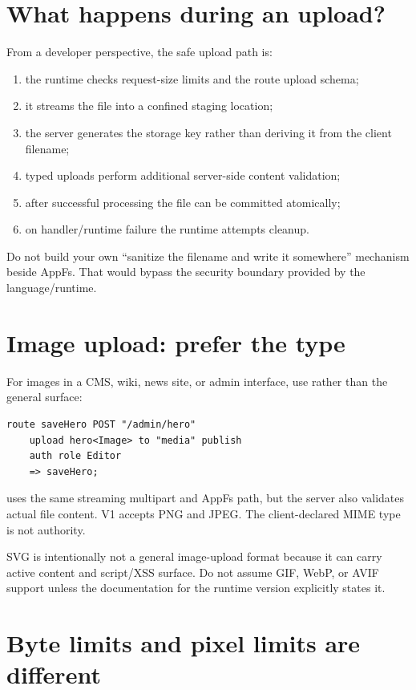\section{What happens during an upload?}

From a developer perspective, the safe upload path is:

\begin{enumerate}
  \item the runtime checks request-size limits and the route upload schema;
  \item it streams the file into a confined staging location;
  \item the server generates the storage key rather than deriving it from the client filename;
  \item typed uploads perform additional server-side content validation;
  \item after successful processing the file can be committed atomically;
  \item on handler/runtime failure the runtime attempts cleanup.
\end{enumerate}

Do not build your own ``sanitize the filename and write it somewhere'' mechanism beside AppFs. That would bypass the security boundary provided by the language/runtime.

\section{Image upload: prefer the  type}

For images in a CMS, wiki, news site, or admin interface, use  rather than the general  surface:

\begin{lstlisting}[language=RWLang]
route saveHero POST "/admin/hero"
    upload hero<Image> to "media" publish
    auth role Editor
    => saveHero;
\end{lstlisting}

 uses the same streaming multipart and AppFs path, but the server also validates actual file content. V1 accepts PNG and JPEG. The client-declared MIME type is not authority.

SVG is intentionally not a general image-upload format because it can carry active content and script/XSS surface. Do not assume GIF, WebP, or AVIF support unless the documentation for the runtime version explicitly states it.

\section{Byte limits and pixel limits are different}

